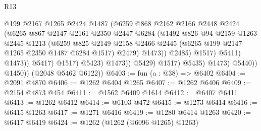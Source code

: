 \begin{lexlean}{R13}
\begin{coremodule}
                                        @199
                                        @2167
                                        @1265
                                        @2424
                                        @1487
                                        (@6259
                                          @868
                                          @2162
                                          @2166
                                          @2448
                                          @2424
                                          (@6265
                                            @867
                                            @2147
                                            @2161
                                            @2350
                                            @2447
                                            @6284
                                            (@1492
                                              @826
                                              @94
                                              @2159
                                              @1263
                                              @2445
                                              @1213
                                              (@6259
                                                @825
                                                @2149
                                                @2158
                                                @2466
                                                @2445
                                                (@6265 @199 @2147 @1265 @2350 @1487 @6284 @1517)
                                                @2479)
                                              @1473))
                                          @2485)
                                        @1517)
                                      @5411)
                                    @1473))
                                @5417)
                              @1517)
                            @5423)
                          @1473))
                      @5429)
                    @1517)
                  @5435)
                @1473)
              @5440))
          @1450))
      (@2048 @5462 @6122))
@6403 := fun (a : @38) => @6402
@6404 := @2091 @4870
@6406 := @1262 @6404 @1265
@6407 := @1262 @6406
@6409 := @2154 @4873 @454
@6411 := @1562 @6409 @1614
@6412 := @6407 @6411
@6413 := @1262 @6412
@6414 := @6103 @472
@6415 := @1273 @6414
@6416 := @6415 @1263
@6417 := @1271 @6416
@6419 := @1280 @6414 @1263
@6420 := @6417 @6419
@6424 := @1262 (@1262 (@6096 @1265) @1263)

\end{coremodule}
\end{lexlean}
